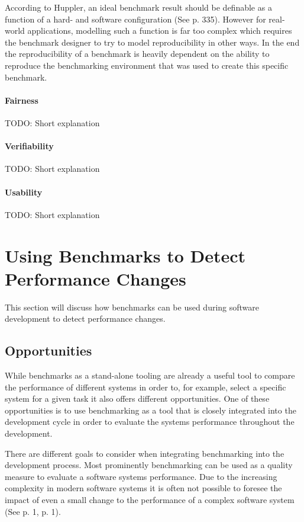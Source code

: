 \documentclass[	runningheads,
				a4paper]{llncs}
\begin{document}
According to Huppler, an ideal benchmark result should be definable as a function of a hard- and software configuration (See \cite{huppler2009} p. 335). However for real-world applications, modelling such a function is far too complex which requires the benchmark designer to try to model reproducibility in other ways. In the end the reproducibility of a benchmark is heavily dependent on the ability to reproduce the benchmarking environment that was used to create this specific benchmark. 

\paragraph{Fairness} TODO: Short explanation
\paragraph{Verifiability} TODO: Short explanation
\paragraph{Usability} TODO: Short explanation

\section{Using Benchmarks to Detect Performance Changes}
\label{sec:bench_perf_changes}
	This section will discuss how benchmarks can be used during software development to detect performance changes.
	
	\subsection{Opportunities}
	\label{ssec:bench_perf_oppo}
	While benchmarks as a stand-alone tooling are already a useful tool to compare the performance of different systems in order to, for example, select a specific system for a given task it also offers different opportunities. One of these opportunities is to use benchmarking as a tool that is closely integrated into the development cycle in order to evaluate the systems performance throughout the development.

	There are different goals to consider when integrating benchmarking into the development process. Most prominently benchmarking can be used as a quality measure to evaluate a software systems performance. Due to the increasing complexity in modern software systems it is often not possible to foresee the impact of even a small change to the performance of a complex software system (See \cite{grambow2019} p. 1, \cite{daly2021} p. 1). 
	
\end{document}
